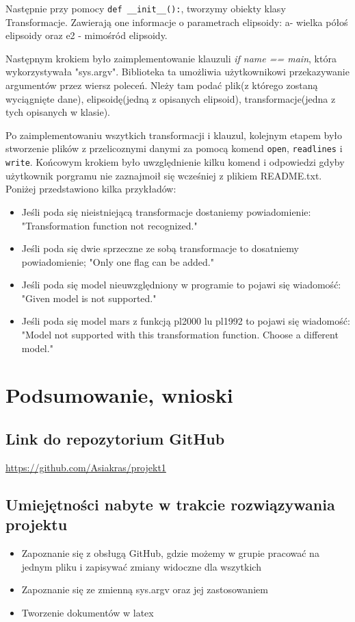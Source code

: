 \documentclass[10pt,a4paper]{article}
\begin{document}
Następnie przy pomocy \verb|def __init__():|, tworzymy  obiekty klasy Transformacje. Zawierają one informacje o parametrach elipsoidy: a- wielka półoś elipsoidy oraz e2 - mimośród elipsoidy. 
\vspace{0.5 cm}

Następnym krokiem było zaimplementowanie klauzuli \textit{if name == main}, która wykorzystywała "sys.argv". Biblioteka ta umożliwia użytkownikowi przekazywanie argumentów przez wiersz poleceń. Nleży tam podać plik(z którego zostaną wyciągnięte dane), elipsoidę(jedną z opisanych elipsoid), transformacje(jedna z tych opisanych w klasie).
\vspace{0.5 cm}

Po zaimplementowaniu wszytkich transformacji i klauzul, kolejnym etapem było stworzenie plików z przelicoznymi danymi za pomocą komend \verb|open|, \verb|readlines| i \verb|write|.\newline
Końcowym krokiem było uwzględnienie kilku komend i odpowiedzi gdyby użytkownik porgramu nie zaznajmoił się wcześniej z plikiem README.txt. Poniżej przedstawiono kilka przykładów:
\begin{itemize}
	
	\item Jeśli poda się nieistniejącą transformacje dostaniemy powiadomienie: "Transformation function not recognized."
	\item Jeśli poda się dwie sprzeczne ze sobą transformacje to dosatniemy powiadomienie; "Only one flag can be added."
	\item Jeśli poda się model nieuwzględniony w programie to pojawi się wiadomość: "Given model is not supported."
	\item Jeśli poda się model mars z funkcją pl2000 lu pl1992 to pojawi się wiadomość: "Model not supported with this transformation function. Choose a different model."
\end{itemize}

\section{Podsumowanie, wnioski}
\subsection{Link do repozytorium GitHub}
\href{https://github.com/Asiakras/projekt1}{https://github.com/Asiakras/projekt1}

\subsection{Umiejętności nabyte w trakcie rozwiązywania projektu}
\begin{itemize}
	\item Zapoznanie się z obsługą GitHub, gdzie możemy w grupie pracować na jednym pliku i zapisywać zmiany widoczne dla wszytkich
	\item Zapoznanie się ze zmienną sys.argv oraz jej zastosowaniem
	\item Tworzenie dokumentów w latex
\end{itemize}
\end{document}
